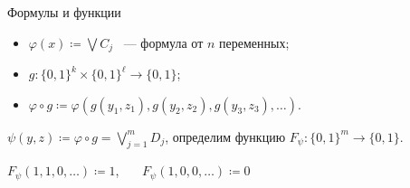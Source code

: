 \begin{frame}{Формулы и функции}



    \pause

    \begin{itemize}
        \item $\varphi(x) \coloneqq \bigvee C_j$ ~--- формула от $n$ переменных;
        \item $g\colon \{0, 1\}^k \times \{0, 1\}^{\ell} \to \{0, 1\}$;
        \pause
        \item $\varphi \circ g \coloneqq \varphi(g(y_1, z_1), g(y_2, z_2), g(y_3, z_3), \dots)$.
    \end{itemize}

    \pause
    $\psi(y, z) \coloneqq \varphi \circ g = \bigvee\limits_{j = 1}^{m} D_j$, определим функцию
    $F_{\psi}\colon \{0, 1\}^m \to \{0, 1\}$.
    \pause
    \vspace{-0.2cm}
    \begin{center}
        
    \end{center}

    \pause
    $F_{\psi}(1, 1, 0, \dots) \coloneqq 1$\pause, ~~~$F_{\psi}(1, 0, 0, \dots) \coloneqq 0$
\end{frame}

